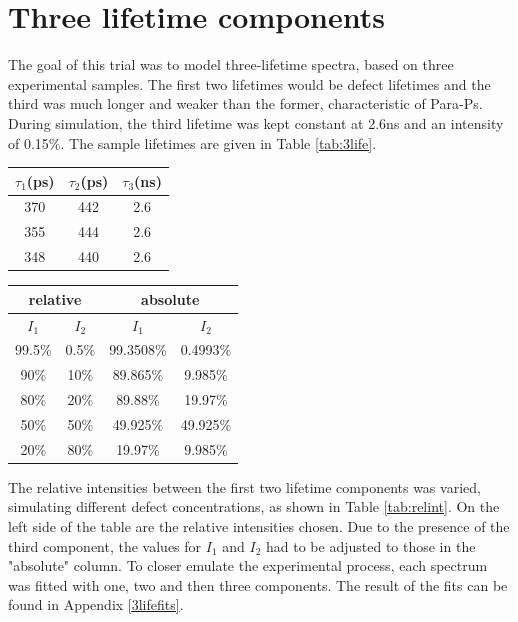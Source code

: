 \section{Three lifetime components}

The goal of this trial was to model three-lifetime spectra, based on three experimental samples. The first two lifetimes would be defect lifetimes and the third was much longer and weaker than the former, characteristic of Para-Ps. During simulation, the third lifetime was kept constant at 2.6ns and an intensity of 0.15\%. The sample lifetimes are given in Table \ref{tab:3life}. 

\vspace{0.5cm}
\begin{minipage}{.35\linewidth}
     
    \begin{tabular}{|c|c|c|}
        \hline
        $\tau_1$(ps) & $\tau_2$(ps) & $\tau_3$(ns)\\
        \hline
        370 & 442 & 2.6 \\
        355 & 444 & 2.6 \\
        348 & 440 & 2.6 \\
        \hline
    \end{tabular}
    \label{tab:3life}
\end{minipage}
\hfill
\begin{minipage}{.6\linewidth}
     
    \begin{tabular}{|c|c|c|c|}
        \hline
        \multicolumn{2}{|c|}{relative} & \multicolumn{2}{|c|}{absolute} \\
        \hline
        $I_1$ & $I_2$ & $I_1$    & $I_2$   \\
        \hline
        99.5\% & 0.5\% & 99.3508\%   &  0.4993\%  \\
        90\%   & 10\%  & 89.865\%    &  9.985\%   \\
        80\%   & 20\%  & 89.88\%     & 19.97\%    \\
        50\%   & 50\%  & 49.925\%    & 49.925\%   \\
        20\%   & 80\%  & 19.97\%     &  9.985\%   \\
        \hline
    \end{tabular}
    \label{tab:relint}
\end{minipage}


The relative intensities between the first two lifetime components was varied, simulating different defect concentrations, as shown in Table \ref{tab:relint}. On the left side of the table are the relative intensities chosen. Due to the presence of the third component, the values for $I_1$ and $I_2$ had to be adjusted to those in the "absolute" column. To closer emulate the experimental process, each spectrum was fitted with one, two and then three components. The result of the fits can be found in Appendix \ref{3lifefits}.

